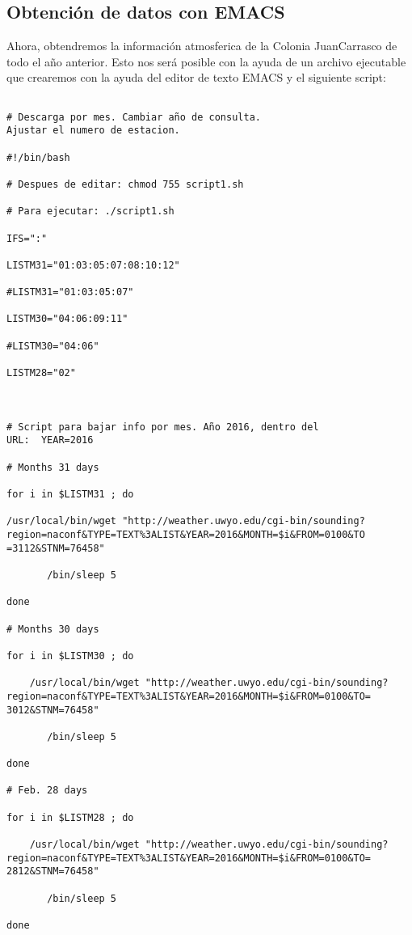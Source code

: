 \documentclass{article}
\begin{document}
\subsection{\huge Obtención de datos con EMACS} \bigskip
Ahora, obtendremos la información atmosferica de la Colonia JuanCarrasco de todo el año anterior. Esto nos será posible con la ayuda de un archivo ejecutable que crearemos con la ayuda del editor de texto EMACS y el siguiente script:
\large
\begin{verbatim}

# Descarga por mes. Cambiar año de consulta.
Ajustar el numero de estacion.

#!/bin/bash

# Despues de editar: chmod 755 script1.sh

# Para ejecutar: ./script1.sh

IFS=":"

LISTM31="01:03:05:07:08:10:12"

#LISTM31="01:03:05:07"

LISTM30="04:06:09:11"

#LISTM30="04:06"

LISTM28="02"

 

# Script para bajar info por mes. Año 2016, dentro del 
URL:  YEAR=2016

# Months 31 days

for i in $LISTM31 ; do

/usr/local/bin/wget "http://weather.uwyo.edu/cgi-bin/sounding?
region=naconf&TYPE=TEXT%3ALIST&YEAR=2016&MONTH=$i&FROM=0100&TO
=3112&STNM=76458"

       /bin/sleep 5

done

# Months 30 days

for i in $LISTM30 ; do

    /usr/local/bin/wget "http://weather.uwyo.edu/cgi-bin/sounding?
region=naconf&TYPE=TEXT%3ALIST&YEAR=2016&MONTH=$i&FROM=0100&TO=
3012&STNM=76458"

       /bin/sleep 5

done

# Feb. 28 days

for i in $LISTM28 ; do

    /usr/local/bin/wget "http://weather.uwyo.edu/cgi-bin/sounding?
region=naconf&TYPE=TEXT%3ALIST&YEAR=2016&MONTH=$i&FROM=0100&TO=
2812&STNM=76458"

       /bin/sleep 5

done
\end{verbatim} \bigskip
\end{document}
